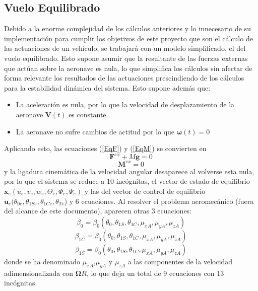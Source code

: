 \subsection{Vuelo Equilibrado}

Debido a la enorme complejidad de los cálculos anteriores y lo innecesario de su implementación para cumplir los objetivos de este proyecto que son el cálculo de las actuaciones de un vehículo, se trabajará con un modelo simplificado, el del vuelo equilibrado. Esto supone asumir que la resultante de las fuerzas externas que actúan sobre la aeronave es nula, lo que simplifica los cálculos sin afectar de forma relevante los resultados de las actuaciones prescindiendo de los cálculos para la estabilidad dinámica del sistema.
Esto supone además que:
\begin{itemize}
	\item La aceleración es nula, por lo que la velocidad de desplazamiento de la aeronave $\mathrm{\textbf{V}}(t)$ es constante.
	\item La aeronave no sufre cambios de actitud por lo que $\boldsymbol{\omega}(t)=0$
\end{itemize}
Aplicando esto, las ecuaciones (\ref{EqF}) y (\ref{EqM}) se convierten en
\begin{equation}
	\mathrm{\textbf{F}}^{ex}+M\mathrm{\textbf{g}}=0
	\label{EqFe}
\end{equation}
\begin{equation}
	\mathrm{\textbf{M}}^{ex}=0
	\label{EqMe}
\end{equation}
y la ligadura cinemática de la velocidad angular desaparece al volverse esta nula, por lo que el sistema se reduce a 10 incógnitas, el vector de estado de equilibrio $\mathrm{\textbf{x}}_e(u_e, v_e, w_e, \Theta_e, \Phi_e, \Psi_e)$ y las del vector de control de equilibrio $\mathrm{\textbf{u}}_e(\theta_{0e}, \theta_{1Se}, \theta_{1Ce}, \theta_{Te}$) y 6 ecuaciones.
Al resolver el problema aeromecánico (fuera del alcance de este documento), aparecen otras 3 ecuaciones:
\begin{equation}
\beta_0=\beta_0(\theta_0,\theta_{1S},\theta_{1C},\mu_{xA},\mu_{yA},\mu_{zA})
\label{beta0}
\end{equation}
\begin{equation}
\beta_{1C}=\beta_0(\theta_0,\theta_{1S},\theta_{1C},\mu_{xA},\mu_{yA},\mu_{zA})
\label{beta1c}
\end{equation}
\begin{equation}
\beta_{1S}=\beta_0(\theta_0,\theta_{1S},\theta_{1C},\mu_{xA},\mu_{yA},\mu_{zA})
\label{beta1s}
\end{equation}
donde se ha denominado $\mu_{xA}$,$\mu_{yA}$ y $\mu_{zA}$ a las componentes de la velocidad adimensionalizada con $\boldsymbol{\Omega}R$, lo que deja un total de 9 ecuaciones con 13 incógnitas.\\

